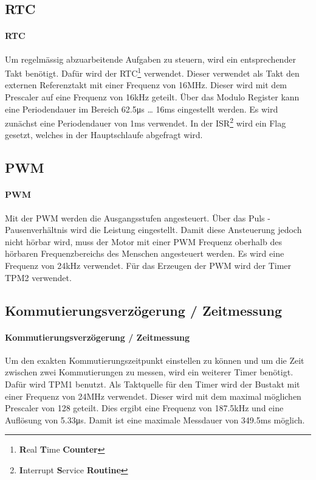\subsection{RTC}
\fi
\ifEMBED
\paragraph{RTC}$~~$\vspace{2mm}\\
\fi
\label{sec:rtc}
Um regelmässig abzuarbeitende Aufgaben zu steuern, wird ein entsprechender 
Takt benötigt. Dafür wird der RTC\footnote{\textbf{R}eal \textbf{T}ime 
\textbf{Counter}} verwendet. Dieser verwendet als Takt den externen 
Referenztakt mit einer Frequenz von 16\si{\mega\hertz}. Dieser wird mit dem 
Prescaler auf eine Frequenz von 16\si{\kilo\hertz} geteilt. Über das Modulo 
Register kann eine Periodendauer im Bereich 62.5\si{\micro\second} \ldots 
16\si{\milli\second} eingestellt werden. Es wird zunächst eine Periodendauer 
von 1\si{\milli\second} verwendet. In der ISR\footnote{\textbf{I}nterrupt 
\textbf{S}ervice \textbf{Routine}} wird ein Flag gesetzt, welches in der 
Hauptschlaufe abgefragt wird. 

\ifSTANDALONE
\subsection{PWM}
\fi
\ifEMBED
\paragraph{PWM}$~~$\vspace{2mm}\\
\fi
Mit der PWM werden 
die Ausgangsstufen angesteuert. Über das Puls - Pausenverhältnis wird die 
Leistung eingestellt. Damit diese Ansteuerung jedoch nicht hörbar wird, muss 
der Motor mit einer PWM Frequenz oberhalb des hörbaren Frequenzbereichs des 
Menschen angesteuert werden. Es wird eine Frequenz von 24\si{\kilo\hertz} 
verwendet.  Für das Erzeugen der PWM wird der Timer TPM2 verwendet. 

\ifSTANDALONE
\subsection{Kommutierungsverzögerung / Zeitmessung}
\fi
\ifEMBED
\paragraph{Kommutierungsverzögerung / Zeitmessung}$~~$\vspace{2mm}\\
\fi
Um den exakten Kommutierungszeitpunkt einstellen zu können und um die Zeit 
zwischen zwei Kommutierungen zu messen, wird ein weiterer Timer benötigt. Dafür 
wird TPM1 benutzt. Als Taktquelle für den Timer wird der Bustakt mit einer 
Frequenz von 24\si{\mega\hertz} verwendet. Dieser wird mit dem maximal möglichen 
Prescaler von 128 geteilt. Dies ergibt eine Frequenz von 187.5\si{\kilo\hertz} 
und eine Auflösung von 5.33\si{\micro\second}. Damit ist eine maximale 
Messdauer von 349.5\si{\milli\second} möglich. 

